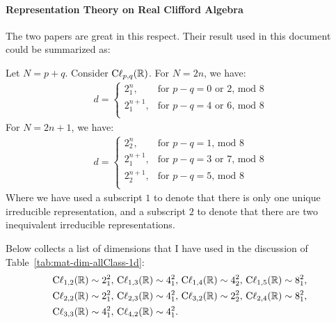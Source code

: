\paragraph{Representation Theory on Real Clifford Algebra}
The two papers \cite{Okubo1991a}\cite{Okubo1991} are great in this respect.
Their result used in this document could be summarized as:
\begin{thm}
    Let $N=p+q$.
	Consider $\mathrm{C\ell}_{p,q}(\mathbb{R})$. For $N=2n$, we have:
	\begin{align}
	d= \begin{cases}
	2^n_1, & \text{for } p-q=0\text{ or }2\text{, mod }8 \\
	2^{n+1}_1, & \text{for } p-q=4\text{ or }6\text{, mod }8 \\
	\end{cases}
	\end{align}
	For $N=2n+1$, we have:
	\begin{align}
	d= \begin{cases}
	2^n_2, & \text{for } p-q=1\text{, mod }8 \\
	2^{n+1}_1, & \text{for } p-q=3\text{ or }7\text{, mod }8 \\
	2^{n+1}_2, & \text{for } p-q=5\text{, mod }8 \\
	\end{cases}
	\end{align}
	Where we have used a subscript $1$ to denote that there is only
	one unique irreducible representation, and a subscript $2$ to
	denote that there are two inequivalent irreducible representations.
\end{thm}
Below collects a list of dimensions that I have used in the discussion of
Table~\ref{tab:mat-dim-allClass-1d}:
\begin{equation}
    \label{eq:Cl-dimenList}
    \begin{aligned}
    &
    \mathrm{C\ell}_{1,2}(\mathbb{R})\sim 2^2_1,\, \mathrm{C\ell}_{1,3}(\mathbb{R})\sim 4^2_1,\,
    \mathrm{C\ell}_{1,4}(\mathbb{R})\sim 4^2_2,\, \mathrm{C\ell}_{1,5}(\mathbb{R})\sim 8^2_1,\,
    \\&
    \mathrm{C\ell}_{2,2}(\mathbb{R})\sim 2^2_1,\, \mathrm{C\ell}_{2,3}(\mathbb{R})\sim 4^2_1,\,
    \mathrm{C\ell}_{3,2}(\mathbb{R})\sim 2^2_2,\, \mathrm{C\ell}_{2,4}(\mathbb{R})\sim 8^2_1,\,
    \\&
    \mathrm{C\ell}_{3,3}(\mathbb{R})\sim 4^2_1,\, \mathrm{C\ell}_{4,2}(\mathbb{R})\sim 4^2_1.
    \end{aligned}
\end{equation}
